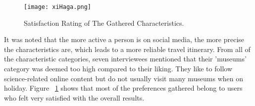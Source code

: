 \begin{figure}[H]
\centering
\texttt{[image: xiHaga.png]}
\caption{Satisfaction Rating of The Gathered Characteristics.}
\label{Satisfaction}
\end{figure}

It was noted that the more active a person is on
social media, the more precise the characteristics are, which leads to a more
reliable travel itinerary. From all of the characteristic categories, seven
interviewees mentioned that their 'museums' category was deemed too high
compared to their liking. They like to follow science-related online content
but do not usually visit many museums when on holiday. Figure
~\ref{Satisfaction} shows that most of the preferences gathered belong to users
who felt very satisﬁed with the overall results.



